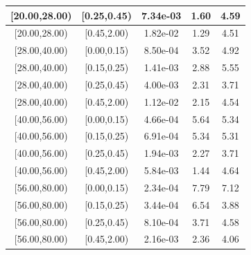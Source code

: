 \documentclass[%
aps, prd, reprint, show pacs, preprint numbers, ams math, amssymb, superscriptaddress, linenumbers]{revtex4-1}
\begin{document}
\begin{table}
\begin{tabular}{|c|c|c|c|c|}
 \hline
[20.00,28.00) & [0.25,0.45) & 7.34e-03 & 1.60 & 4.59 \\ 
 \hline
[20.00,28.00) & [0.45,2.00) & 1.82e-02 & 1.29 & 4.51 \\ 
 \hline
[28.00,40.00) & [0.00,0.15) & 8.50e-04 & 3.52 & 4.92 \\ 
 \hline
[28.00,40.00) & [0.15,0.25) & 1.41e-03 & 2.88 & 5.55 \\ 
 \hline
[28.00,40.00) & [0.25,0.45) & 4.00e-03 & 2.31 & 3.71 \\ 
 \hline
[28.00,40.00) & [0.45,2.00) & 1.12e-02 & 2.15 & 4.54 \\ 
 \hline
[40.00,56.00) & [0.00,0.15) & 4.66e-04 & 5.64 & 5.34 \\ 
 \hline
[40.00,56.00) & [0.15,0.25) & 6.91e-04 & 5.34 & 5.31 \\ 
 \hline
[40.00,56.00) & [0.25,0.45) & 1.94e-03 & 2.27 & 3.71 \\ 
 \hline
[40.00,56.00) & [0.45,2.00) & 5.84e-03 & 1.44 & 4.64 \\ 
 \hline
[56.00,80.00) & [0.00,0.15) & 2.34e-04 & 7.79 & 7.12 \\ 
 \hline
[56.00,80.00) & [0.15,0.25) & 3.44e-04 & 6.54 & 3.88 \\ 
 \hline
[56.00,80.00) & [0.25,0.45) & 8.10e-04 & 3.71 & 4.58 \\ 
 \hline
[56.00,80.00) & [0.45,2.00) & 2.16e-03 & 2.36 & 4.06 \\ 
 \hline
\end{tabular}
\label{table:FinalPiPlusYields}
\end{table}
\end{document}
